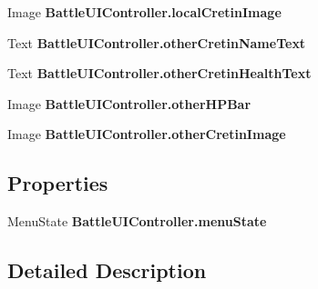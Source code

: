 \begin{DoxyCompactItemize}
\item 
\hypertarget{group__client_ga439b1d52e7ba7833ecac8b5af098ce53}{Image {\bfseries Battle\-U\-I\-Controller.\-local\-Cretin\-Image}}\label{group__client_ga439b1d52e7ba7833ecac8b5af098ce53}

\item 
\hypertarget{group__client_gad58b390bc1a3e5cf185cbee5d300dcef}{Text {\bfseries Battle\-U\-I\-Controller.\-other\-Cretin\-Name\-Text}}\label{group__client_gad58b390bc1a3e5cf185cbee5d300dcef}

\item 
\hypertarget{group__client_gad9604d7804d5c5c0bb227bf3b67fc2d4}{Text {\bfseries Battle\-U\-I\-Controller.\-other\-Cretin\-Health\-Text}}\label{group__client_gad9604d7804d5c5c0bb227bf3b67fc2d4}

\item 
\hypertarget{group__client_gab3cc33d5aeca7b5fca82f8de11ac072e}{Image {\bfseries Battle\-U\-I\-Controller.\-other\-H\-P\-Bar}}\label{group__client_gab3cc33d5aeca7b5fca82f8de11ac072e}

\item 
\hypertarget{group__client_ga9f4c72551b5bcd3a3718802c49af0267}{Image {\bfseries Battle\-U\-I\-Controller.\-other\-Cretin\-Image}}\label{group__client_ga9f4c72551b5bcd3a3718802c49af0267}

\end{DoxyCompactItemize}
\subsection*{Properties}
\begin{DoxyCompactItemize}
\item 
\hypertarget{group__client_ga4f8584c7f4ebdeb9b29bf982dc8a5e5d}{Menu\-State {\bfseries Battle\-U\-I\-Controller.\-menu\-State}}\label{group__client_ga4f8584c7f4ebdeb9b29bf982dc8a5e5d}

\end{DoxyCompactItemize}


\subsection{Detailed Description}



